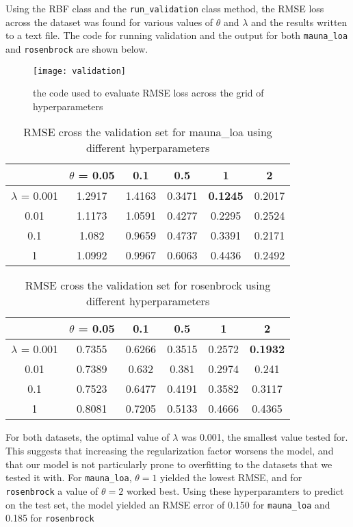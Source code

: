 \documentclass{article}
\begin{document}
Using the RBF class and the \verb+run_validation+ class method, the RMSE loss across the dataset was found for various values of $\theta$ and $\lambda$ and the results written to a text file. The code for running validation and the output for both \verb+mauna_loa+ and \verb+rosenbrock+ are shown below.

\begin{figure}[H]
\centering
\texttt{[image: validation]}
\caption{the code used to evaluate RMSE loss across the grid of hyperparameters}
\end{figure}

\begin{table}
\begin{center}
\begin{tabular}{|c|c|c|c|c|c|}
\hline
 & $\theta$ = 0.05 & 0.1 & 0.5 & 1 & 2 \\ \hline
 $\lambda$ = 0.001  & 1.2917 & 1.4163 & 0.3471 & \textbf{0.1245} & 0.2017\\ \hline
 0.01 & 1.1173 & 1.0591 & 0.4277 & 0.2295 & 0.2524\\ \hline
 0.1 & 1.082 & 0.9659 & 0.4737 & 0.3391 & 0.2171\\ \hline
 1 & 1.0992 & 0.9967 & 0.6063 & 0.4436 & 0.2492\\
 \hline
\end{tabular}
\caption{RMSE cross the validation set for mauna\_loa using different hyperparameters}
\end{center}
\end{table}

\begin{table}
\begin{center}
\begin{tabular}{|c|c|c|c|c|c|}
\hline
 & $\theta$ = 0.05 & 0.1 & 0.5 & 1 & 2 \\ \hline
 $\lambda$ = 0.001  & 0.7355 & 0.6266 & 0.3515 & 0.2572 & \textbf{0.1932}\\ \hline
 0.01 & 0.7389 & 0.632 & 0.381 & 0.2974 & 0.241\\ \hline
 0.1 & 0.7523 & 0.6477 & 0.4191 & 0.3582 & 0.3117\\ \hline
 1 & 0.8081 & 0.7205 & 0.5133 & 0.4666 & 0.4365\\
 \hline
\end{tabular}
\caption{RMSE cross the validation set for rosenbrock using different hyperparameters}
\end{center}
\end{table}

For both datasets, the optimal value of $\lambda$ was 0.001, the smallest value tested for. This suggests that increasing the regularization factor worsens the model, and that our model is not particularly prone to overfitting to the datasets that we tested it with. For \verb+mauna_loa+, $\theta = 1$ yielded the lowest RMSE, and for \verb+rosenbrock+ a value of $\theta = 2$ worked best. Using these hyperparamters to predict on the test set, the model yielded an RMSE error of 0.150 for \verb+mauna_loa+ and 0.185 for \verb+rosenbrock+
\end{document}
